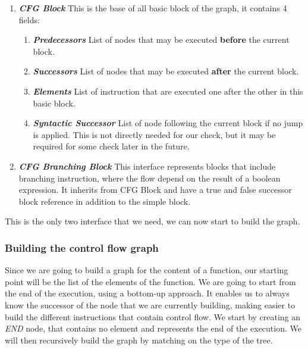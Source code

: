 \begin{enumerate}
	\item \textbf{\textit{CFG Block}} \newline 
	This is the base of all basic block of the graph, it contains 4 fields:
	\begin{enumerate}
		\item \textbf{\textit{Predecessors}} \newline
		List of nodes that may be executed \textbf{before} the current block.\newline
		\item \textbf{\textit{Successors}} \newline
		List of nodes that may be executed \textbf{after} the current block.\newline
		\item \textbf{\textit{Elements}} \newline
		List of instruction that are executed one after the other in this basic block. \newline
		\item \textbf{\textit{Syntactic Successor}} \newline
		List of node following the current block if no jump is applied. 
		This is not directly needed for our check, but it may be required for some check later in the future.\newline
	\end{enumerate}
	\item \textbf{\textit{CFG Branching Block}} \newline 
	This interface represents blocks that include branching instruction, where the flow depend on the result of a boolean expression. 
	It inherits from CFG Block and have a true and false successor block reference in addition to the simple block.
	\newline 
\end{enumerate}
This is the only two interface that we need, we can now start to build the graph.

\subsubsection{Building the control flow graph}
\label{subsubsec:building_the_graph}
Since we are going to build a graph for the content of a function, our starting point will be the list of the elements of the function.
We are going to start from the end of the execution, using a bottom-up approach.
It enables us to always know the successor of the node that we are currently building, making easier to build the different instructions that contain control flow.
We start by creating an \emph{END} node, that contains no element and represents the end of the execution.
We will then recursively build the graph by matching on the type of the tree.

